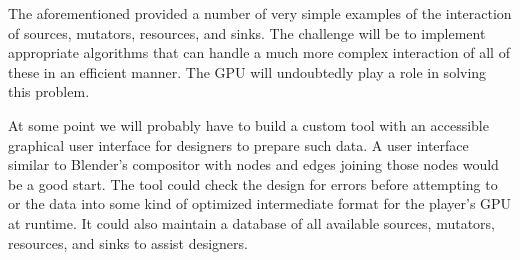 



The aforementioned provided a number of very simple examples of the interaction of sources, mutators, resources, and sinks. The challenge will be to implement appropriate algorithms that can handle a much more complex interaction of all of these in an efficient manner. The GPU will undoubtedly play a role in solving this problem.

At some point we will probably have to build a custom tool with an accessible graphical user interface for designers to prepare such data. A user interface similar to Blender's compositor with nodes and edges joining those nodes would be a good start. The tool could check the design for errors before attempting to  or  the data into some kind of optimized intermediate format for the player's GPU at runtime. It could also maintain a database of all available sources, mutators, resources, and sinks to assist designers.

